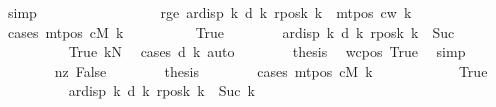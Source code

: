 \begin{isabellebody}
\ simp\isanewline
\ \ \ \ \ \ \isamarkupfalse%
\isanewline
\ \ \ \ \isamarkupfalse%
\isanewline
\ \ \ \ \isamarkupfalse%
\ rge{\isacharcolon}{\kern0pt}\ {\isachardoublequoteopen}ar{\isacharunderscore}{\kern0pt}disp\ {\isacharquery}{\kern0pt}k\ {\isacharparenleft}{\kern0pt}d\ k{\isacharparenright}{\kern0pt}\ {\isacharparenleft}{\kern0pt}{\isacharquery}{\kern0pt}rposk\ k{\isacharparenright}{\kern0pt}\ {\isasymle}\ mt{\isacharunderscore}{\kern0pt}pos\ c{\isacharunderscore}{\kern0pt}w\ k{\isachardoublequoteclose}\isanewline
\ \ \ \ \isamarkupfalse%
\ {\isacharparenleft}{\kern0pt}cases\ {\isachardoublequoteopen}mt{\isacharunderscore}{\kern0pt}pos\ cM\ k\ {\isacharequal}{\kern0pt}\ {}{\isachardoublequoteclose}{\isacharparenright}{\kern0pt}\isanewline
\ \ \ \ \ \ \isamarkupfalse%
\ True\isanewline
\ \ \ \ \ \ \isamarkupfalse%
\ {\isachardoublequoteopen}ar{\isacharunderscore}{\kern0pt}disp\ {\isacharquery}{\kern0pt}k\ {\isacharparenleft}{\kern0pt}d\ k{\isacharparenright}{\kern0pt}\ {\isacharparenleft}{\kern0pt}{\isacharquery}{\kern0pt}rposk\ k{\isacharparenright}{\kern0pt}\ {\isasymle}\ Suc\ {}{\isachardoublequoteclose}\isanewline
\ \ \ \ \ \ \ \ \isamarkupfalse%
\ True\ kN\ \isamarkupfalse%
\ {\isacharparenleft}{\kern0pt}cases\ {\isachardoublequoteopen}d\ k{\isachardoublequoteclose}{\isacharparenright}{\kern0pt}\ auto\isanewline
\ \ \ \ \ \ \isamarkupfalse%
\ {\isacharquery}{\kern0pt}thesis\ \isamarkupfalse%
\ wcpos\ True\ \isamarkupfalse%
\ simp\isanewline
\ \ \ \ \isamarkupfalse%
\isanewline
\ \ \ \ \ \ \isamarkupfalse%
\ nz{\isacharcolon}{\kern0pt}\ False\isanewline
\ \ \ \ \ \ \isamarkupfalse%
\ {\isacharquery}{\kern0pt}thesis\isanewline
\ \ \ \ \ \ \isamarkupfalse%
\ {\isacharparenleft}{\kern0pt}cases\ {\isachardoublequoteopen}mt{\isacharunderscore}{\kern0pt}pos\ cM\ k\ {\isacharequal}{\kern0pt}\ {}{\isachardoublequoteclose}{\isacharparenright}{\kern0pt}\isanewline
\ \ \ \ \ \ \ \ \isamarkupfalse%
\ True\isanewline
\ \ \ \ \ \ \ \ \isamarkupfalse%
\ {\isachardoublequoteopen}ar{\isacharunderscore}{\kern0pt}disp\ {\isacharquery}{\kern0pt}k\ {\isacharparenleft}{\kern0pt}d\ k{\isacharparenright}{\kern0pt}\ {\isacharparenleft}{\kern0pt}{\isacharquery}{\kern0pt}rposk\ k{\isacharparenright}{\kern0pt}\ {\isasymle}\ Suc\ {\isacharquery}{\kern0pt}k{\isachardoublequoteclose}\isanewline

\end{isabellebody}
